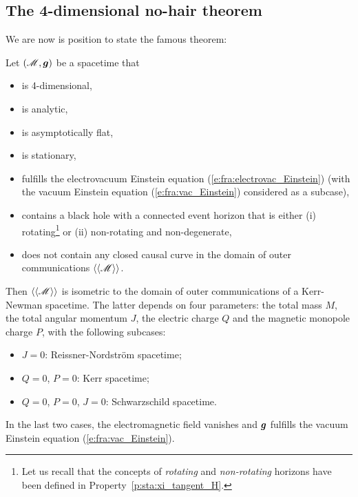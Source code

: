 \subsection{The 4-dimensional no-hair theorem} \label{s:sta:the_no-hair_thm}

We are now is position to state the famous theorem:
\begin{prop}
\label{p:sta:no-hair_thm}
Let $(\mathscr{M},\bm{g})$ be a spacetime that
\begin{itemize}
\item is 4-dimensional,
\item is analytic,
\item is asymptotically flat,
\item is stationary,
\item fulfills the electrovacuum Einstein equation (\ref{e:fra:electrovac_Einstein}) (with the vacuum Einstein equation (\ref{e:fra:vac_Einstein}) considered as a subcase),
\item contains a black hole with a connected event horizon
that is either (i) rotating\footnote{Let us recall that
the concepts of \emph{rotating} and \emph{non-rotating} horizons
have been defined in Property~\ref{p:sta:xi_tangent_H}.}
 or (ii) non-rotating and non-degenerate,
\item does not contain any closed causal curve in the domain of outer
communications $\langle\langle \mathscr{M}\rangle\rangle$.
\end{itemize}
Then $\langle\langle \mathscr{M}\rangle\rangle$ is isometric
to the domain of outer communications of a Kerr-Newman spacetime.
The latter depends on four parameters: the total mass $M$, the
total angular momentum $J$, the electric charge $Q$ and the magnetic
monopole charge $P$, with the following subcases:
\begin{itemize}
\item $J=0$: Reissner-Nordström spacetime;
\item $Q=0$, $P=0$: Kerr spacetime;
\item $Q=0$, $P=0$, $J=0$: Schwarzschild spacetime.
\end{itemize}
In the last two cases, the electromagnetic field vanishes and $\bm{g}$
fulfills the vacuum Einstein equation (\ref{e:fra:vac_Einstein}).
\end{prop}
